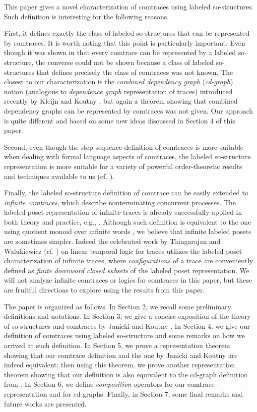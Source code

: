 \documentclass{llncs}
\begin{document}
This paper gives a novel characterization of comtraces using labeled so-structures. Such definition is interesting for the following reasons. 

First, it defines exactly the class of labeled so-structures that can be represented by comtraces. It is worth noting that this point is particularly important. Even though it was shown in \cite{JK95} that every comtrace can be represented by a labeled so-structure, the converse could not be shown because a class of labeled so-structures that defines precisely the class of  comtraces was not known. The closest to our characterization is  the \emph{combined dependency graph} (\emph{cd-graph}) notion (analogous to \emph{dependence graph} representation of traces) introduced recently by Kleijn and Koutny \cite{KK08}, but again a theorem showing that combined dependency graphs can be represented by comtraces was not given. Our approach is quite different and based on some new ideas discussed in Section 4 of this paper. 

Second, even though the step sequence definition of comtraces is more suitable when dealing with formal language aspects of comtraces, the labeled so-structure representation is more suitable for a variety of powerful order-theoretic results and techniques available to us (cf. \cite{Fis,DP02,J0}). 


Finally, the labeled so-structure definition of comtrace can be easily extended to \emph{infinite comtraces}, which describe nonterminating concurrent processes. The labeled poset representation of infinite traces is already successfully applied in both theory and practice, e.g.,  \cite{TW02,FM06,FM07,GGH09}. Although such definition is equivalent to  the one using quotient monoid over infinite words \cite{Gas90,Die91}, we believe that infinite labeled posets are sometimes simpler. Indeed the celebrated work by Thiagarajan and Walukiewicz (cf. \cite{TW02}) on linear temporal logic for traces utilizes the labeled poset characterization of infinite traces, where \emph{configurations} of a trace are conveniently defined as \emph{finite downward closed subsets} of the labeled poset representation. We will not analyze infinite comtraces or logics for comtraces in this paper, but these are fruitful directions to explore using the results from this paper.


The paper is organized as follows. In Section 2, we recall some preliminary definitions and notations. In Section 3, we give a concise exposition of the theory of so-structures and comtraces by Janicki and  Koutny \cite{JK95,JK97}. In Section 4, we give our definition of comtraces using labeled so-structure and some remarks on how we arrived  at such definition. In Section 5, we prove a representation theorem showing that our comtrace definition and the one by Janicki and Koutny are indeed equivalent; then using this theorem, we prove another representation theorem showing that our definition is also equivalent to the cd-graph definition from \cite{KK08}. In Section 6, we define  \emph{composition} operators for our comtrace representation and for cd-graphs. Finally, in Section 7, some final remarks and future works are presented.
\end{document}

